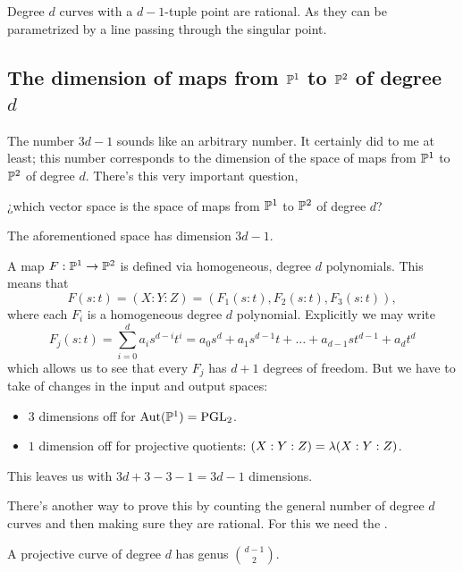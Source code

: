 \documentclass[12pt]{memoir}
\begin{document}
\begin{Ex}
    Degree $d$ curves with a $d-1$-tuple point are rational. As they can be parametrized by a line passing through the singular point. 
\end{Ex}

\subsection{The dimension of maps from $\mathbb{P}^1$ to $\mathbb{P}^2$ of degree $d$}

The number $3d-1$ sounds like an arbitrary number. It certainly did to me at least; this number corresponds to the dimension of the space of maps from $\mathbb{P}^1$ to $\mathbb{P}^2$ of degree $d$. There's this very important question, 
\begin{significant}
¿which vector space is the space of maps from $\mathbb{P}^1$ to $\mathbb{P}^2$  of degree $d$?
\end{significant}

\begin{Prop}\label{prop-dimension-maps-P1-to-P2}
The aforementioned space has dimension $3d-1$.
\end{Prop}

\begin{ptcbp}
A map $F:\mathbb{P}^1\to\mathbb{P}^2$ is defined via homogeneous, degree $d$ polynomials. This means that 
$$F(s:t)=(X:Y:Z)=(F_1(s:t),F_2(s:t),F_3(s:t)),$$
where each $F_i$ is a homogeneous degree $d$ polynomial. Explicitly we may write 
$$F_j(s:t)=\sum_{i=0}^da_is^{d-i}t^{i}=a_0s^d+a_1s^{d-1}t+\dots+a_{d-1}st^{d-1}+a_dt^d$$
which allows us to see that every $F_j$ has $d+1$ degrees of freedom. But we have to take of changes in the input and output spaces:
\begin{itemize}
    \item $3$ dimensions off for $\operatorname{Aut}(\mathbb{P}^1)=\operatorname{PGL}_2$.
    \item $1$ dimension off for projective quotients: $(X:Y:Z)=\lambda(X:Y:Z)$.
\end{itemize}
This leaves us with $3d+3-3-1=3d-1$ dimensions. 
\end{ptcbp}

There's another way to prove this by counting the general number of degree $d$ curves and then making sure they are rational. For this we need the .

\begin{Prop}\label{prop-genus-degree-formula}
    A projective curve of degree $d$ has genus $\binom{d-1}{2}$.
\end{Prop}
\end{document}
